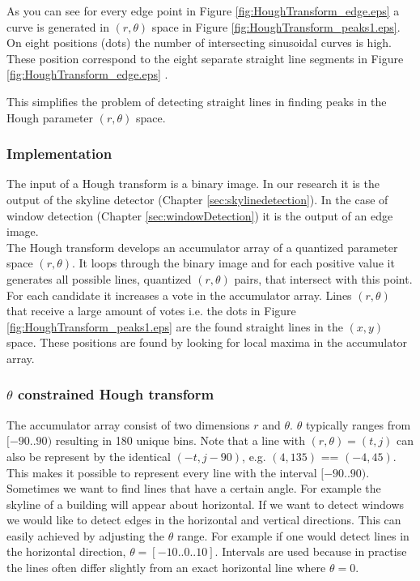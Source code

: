 	 
	 As you can see for every edge point 
	 in Figure \ref{fig:HoughTransform_edge.eps} 
	 a curve is generated in $(r,\theta)$ space in Figure 
\ref{fig:HoughTransform_peaks1.eps}.
	 On eight positions (dots) the number of intersecting sinusoidal
	 curves is high. These position correspond to the eight separate straight
	 line segments in Figure \ref{fig:HoughTransform_edge.eps} .
	
	This simplifies the problem of detecting straight lines in finding peaks in the 
	Hough parameter $(r,\theta)$ space.

\subsubsection{Implementation}
	The input of a Hough transform is a binary image. In our research it is the output of 
	the skyline detector (Chapter \ref{sec:skylinedetection}). In the case of window
	detection (Chapter \ref{sec:windowDetection}) it is the output of an edge image.\\

	The Hough transform develops an accumulator array of a quantized parameter space $(r, \theta)$.  It loops through the binary image and for each positive value 
	it generates all possible lines, quantized $(r, \theta)$ pairs, that intersect with this point.
	For each candidate it increases a vote in the accumulator array.
	Lines $(r, \theta)$ that receive a large amount of votes
	i.e. the dots in Figure \ref{fig:HoughTransform_peaks1.eps} are the found straight lines in the $(x,y)$ space.  These positions are found by looking for local maxima in the accumulator array.

\subsubsection{$\theta$ constrained Hough transform}
The accumulator array consist of two dimensions $r$ and $\theta$.
$\theta$ typically ranges from $[-90..90)$ resulting in 180 unique bins.
Note that a line with $(r, \theta) = (t,j)$ can also be represent by the identical $(-t, j-90)$, e.g. $(4, 135)$ == $(-4, 45)$.
This makes it possible to represent every line with the interval $[-90..90)$.\\

Sometimes we want to find lines that have a certain angle.
For example the skyline of a building will appear about horizontal. If we
want to detect windows we would like to detect edges in the horizontal and vertical directions.
This can easily achieved by adjusting the $\theta$ range.
For example if one would detect lines in the horizontal direction, $\theta = [-10..0..10]$. Intervals are used because in practise the lines
often differ slightly from an exact horizontal line where $\theta = 0$.
	
